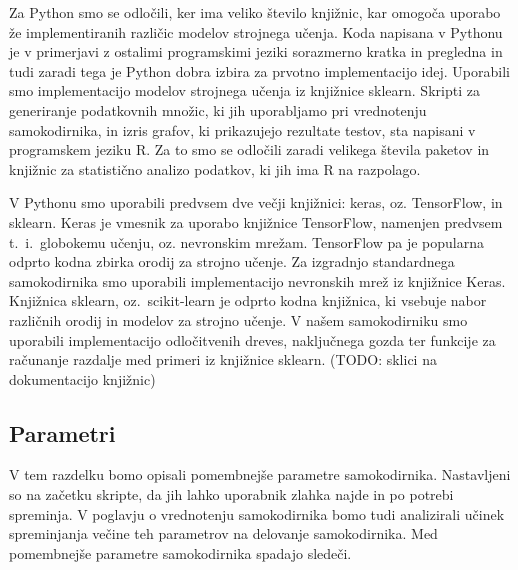 \documentclass[12pt,a4paper]{article}
\begin{document}
Za Python smo se odločili, ker ima veliko število knjižnic, kar omogoča uporabo že implementiranih različic modelov strojnega učenja.
Koda napisana v Pythonu je v primerjavi z ostalimi programskimi jeziki sorazmerno kratka in pregledna in tudi zaradi tega je Python dobra izbira za prvotno implementacijo idej.
Uporabili smo implementacijo modelov strojnega učenja iz knjižnice sklearn.
Skripti za generiranje podatkovnih množic, ki jih uporabljamo pri vrednotenju samokodirnika, in izris grafov, ki prikazujejo rezultate testov, sta napisani v programskem jeziku R.
Za to smo se odločili zaradi velikega števila paketov in knjižnic za statistično analizo podatkov, ki jih ima R na razpolago.

V Pythonu smo uporabili predvsem dve večji knjižnici: keras, oz. TensorFlow, in sklearn.
Keras je vmesnik za uporabo knjižnice TensorFlow, namenjen predvsem t.~i.\ globokemu učenju, oz. nevronskim mrežam. 
TensorFlow pa je popularna odprto kodna zbirka orodij za strojno učenje.
Za izgradnjo standardnega samokodirnika smo uporabili implementacijo nevronskih mrež iz knjižnice Keras.
Knjižnica sklearn, oz.\ scikit-learn je odprto kodna knjižnica, ki vsebuje nabor različnih orodij in modelov za strojno učenje.
V našem samokodirniku smo uporabili implementacijo odločitvenih dreves, naključnega gozda ter funkcije za računanje razdalje med primeri iz knjižnice sklearn.
(TODO: sklici na dokumentacijo knjižnic)


\subsection{Parametri}

V tem razdelku bomo opisali pomembnejše parametre samokodirnika. 
Nastavljeni so na začetku skripte, da jih lahko uporabnik zlahka najde in po potrebi spreminja.
V poglavju o vrednotenju samokodirnika bomo tudi analizirali učinek spreminjanja večine teh parametrov na delovanje samokodirnika.
Med pomembnejše parametre samokodirnika spadajo sledeči.
\end{document}
